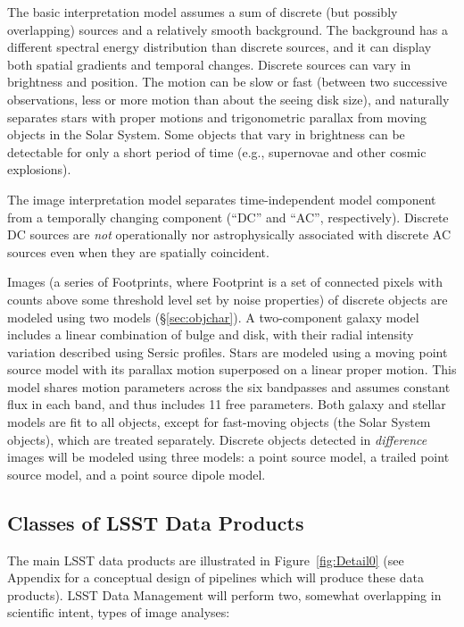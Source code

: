 \documentclass[12pt]{article}
\begin{document}
The basic interpretation model assumes a sum of discrete (but possibly overlapping)
sources and a relatively smooth background. The background has a different
spectral energy distribution than discrete sources, and it can display both
spatial gradients and temporal changes. Discrete sources can vary
in brightness and position. The motion can be slow or fast (between two successive observations,
less or more motion than about the seeing disk size), and naturally separates stars
with proper motions and trigonometric parallax from moving objects in the Solar System.
Some objects that vary in brightness can be detectable for only a short period of time
(e.g., supernovae and other cosmic explosions).

The image interpretation model separates time-independent model
component from a temporally changing component (``DC'' and ``AC'',
respectively). Discrete DC sources are \textit{not} operationally nor astrophysically
associated with discrete AC sources even when they are spatially coincident.

Images (a series of Footprints, where Footprint is a set of connected pixels with
counts above some threshold level set by noise properties) of discrete objects are
modeled using two models (\S\ref{sec:objchar}). A two-component galaxy model includes a linear
combination of bulge and disk, with their radial intensity variation described using
Sersic profiles.
Stars are modeled using a moving point source model with its parallax motion
superposed on a linear proper motion. This model shares motion parameters across
the six bandpasses and assumes constant flux in each band, and thus includes
11 free parameters. Both galaxy and stellar models are fit to all objects, except
for fast-moving objects (the Solar System objects), which are treated separately.
Discrete objects detected in \emph{difference} images will be modeled using three models:
a point source model, a trailed point source model, and a point source dipole model.

\subsection{Classes of LSST Data Products}

The main LSST data products are illustrated in Figure~\ref{fig:Detail0} (see Appendix for
a conceptual design of pipelines which will produce these data products).
LSST Data Management will perform two, somewhat overlapping in scientific intent, types of image analyses:
\end{document}
